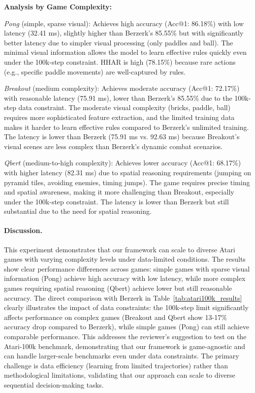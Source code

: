 \documentclass{article} %
\newcommand{\revise}[1]{#1}
\begin{document}
\revise{\textbf{Analysis by Game Complexity:}}

\revise{\textit{Pong} (simple, sparse visual): Achieves high accuracy (Acc@1: 86.18\%) with low latency (32.41 ms), slightly higher than Berzerk's 85.55\% but with significantly better latency due to simpler visual processing (only paddles and ball). The minimal visual information allows the model to learn effective rules quickly even under the 100k-step constraint. HHAR is high (78.15\%) because rare actions (e.g., specific paddle movements) are well-captured by rules.}

\revise{\textit{Breakout} (medium complexity): Achieves moderate accuracy (Acc@1: 72.17\%) with reasonable latency (75.91 ms), lower than Berzerk's 85.55\% due to the 100k-step data constraint. The moderate visual complexity (bricks, paddle, ball) requires more sophisticated feature extraction, and the limited training data makes it harder to learn effective rules compared to Berzerk's unlimited training. The latency is lower than Berzerk (75.91 ms vs. 92.63 ms) because Breakout's visual scenes are less complex than Berzerk's dynamic combat scenarios.}

\revise{\textit{Qbert} (medium-to-high complexity): Achieves lower accuracy (Acc@1: 68.17\%) with higher latency (82.31 ms) due to spatial reasoning requirements (jumping on pyramid tiles, avoiding enemies, timing jumps). The game requires precise timing and spatial awareness, making it more challenging than Breakout, especially under the 100k-step constraint. The latency is lower than Berzerk but still substantial due to the need for spatial reasoning.}
\revise{\paragraph{Discussion.}
This experiment demonstrates that our framework can scale to diverse Atari games with varying complexity levels under data-limited conditions. The results show clear performance differences across games: simple games with sparse visual information (Pong) achieve high accuracy with low latency, while more complex games requiring spatial reasoning (Qbert) achieve lower but still reasonable accuracy. The direct comparison with Berzerk in Table~\ref{tab:atari100k_results} clearly illustrates the impact of data constraints: the 100k-step limit significantly affects performance on complex games (Breakout and Qbert show 13-17\% accuracy drop compared to Berzerk), while simple games (Pong) can still achieve comparable performance. This addresses the reviewer's suggestion to test on the Atari-100k benchmark, demonstrating that our framework is game-agnostic and can handle larger-scale benchmarks even under data constraints. The primary challenge is data efficiency (learning from limited trajectories) rather than methodological limitations, validating that our approach can scale to diverse sequential decision-making tasks.}
\end{document}
